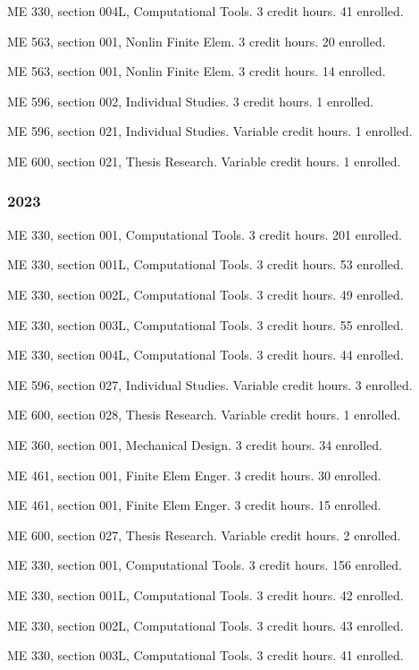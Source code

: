 \documentclass[
]{article}
\begin{document}
ME 330, section 004L, Computational Tools. 3 credit hours. 41 enrolled.

ME 563, section 001, Nonlin Finite Elem. 3 credit hours. 20 enrolled.

ME 563, section 001, Nonlin Finite Elem. 3 credit hours. 14 enrolled.

ME 596, section 002, Individual Studies. 3 credit hours. 1 enrolled.

ME 596, section 021, Individual Studies. Variable credit hours. 1
enrolled.

ME 600, section 021, Thesis Research. Variable credit hours. 1 enrolled.

\subsubsection{2023}\label{section-1}

ME 330, section 001, Computational Tools. 3 credit hours. 201 enrolled.

ME 330, section 001L, Computational Tools. 3 credit hours. 53 enrolled.

ME 330, section 002L, Computational Tools. 3 credit hours. 49 enrolled.

ME 330, section 003L, Computational Tools. 3 credit hours. 55 enrolled.

ME 330, section 004L, Computational Tools. 3 credit hours. 44 enrolled.

ME 596, section 027, Individual Studies. Variable credit hours. 3
enrolled.

ME 600, section 028, Thesis Research. Variable credit hours. 1 enrolled.

ME 360, section 001, Mechanical Design. 3 credit hours. 34 enrolled.

ME 461, section 001, Finite Elem Enger. 3 credit hours. 30 enrolled.

ME 461, section 001, Finite Elem Enger. 3 credit hours. 15 enrolled.

ME 600, section 027, Thesis Research. Variable credit hours. 2 enrolled.

ME 330, section 001, Computational Tools. 3 credit hours. 156 enrolled.

ME 330, section 001L, Computational Tools. 3 credit hours. 42 enrolled.

ME 330, section 002L, Computational Tools. 3 credit hours. 43 enrolled.

ME 330, section 003L, Computational Tools. 3 credit hours. 41 enrolled.
\end{document}
